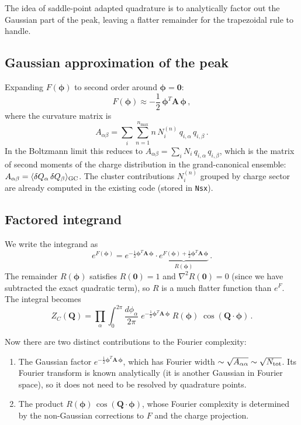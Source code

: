 \documentclass[11pt,a4paper]{article}
\newcommand{\bphi}{\bm{\phi}}
\newcommand{\bQ}{\bm{Q}}
\newcommand{\bA}{\bm{A}}
\begin{document}
The idea of saddle-point adapted quadrature is to analytically factor out the Gaussian part of the peak, leaving a flatter remainder for the trapezoidal rule to handle.

\subsection{Gaussian approximation of the peak}

Expanding $F(\bphi)$ to second order around $\bphi = \bm{0}$:
\begin{equation}\label{eq:F-expand}
  F(\bphi) \approx -\frac{1}{2}\,\bphi^T \bA\,\bphi\,,
\end{equation}
where the curvature matrix is
\begin{equation}\label{eq:A-def}
  A_{\alpha\beta} = \sum_i \sum_{n=1}^{n_{\max}} n\,N_i^{(n)}\,q_{i,\alpha}\,q_{i,\beta}\,.
\end{equation}
In the Boltzmann limit this reduces to $A_{\alpha\beta} = \sum_i N_i\,q_{i,\alpha}\,q_{i,\beta}$, which is the matrix of second moments of the charge distribution in the grand-canonical ensemble: $A_{\alpha\beta} = \langle \delta Q_\alpha\,\delta Q_\beta \rangle_{\rm GC}$.
The cluster contributions $N_i^{(n)}$ grouped by charge sector are already computed in the existing code (stored in \texttt{Nsx}).

\subsection{Factored integrand}

We write the integrand as
\begin{equation}\label{eq:factored}
  e^{F(\bphi)} = e^{-\frac{1}{2}\bphi^T \bA\,\bphi} \cdot \underbrace{e^{F(\bphi) + \frac{1}{2}\bphi^T \bA\,\bphi}}_{R(\bphi)}\,.
\end{equation}
The remainder $R(\bphi)$ satisfies $R(\bm{0}) = 1$ and $\nabla^2 R(\bm{0}) = 0$ (since we have subtracted the exact quadratic term), so $R$ is a much flatter function than $e^{F}$.
The integral becomes
\begin{equation}\label{eq:ZC-factored}
  Z_C(\bQ) = \prod_\alpha \int_0^{2\pi} \frac{d\phi_\alpha}{2\pi}\;
  e^{-\frac{1}{2}\bphi^T \bA\,\bphi}\;R(\bphi)\;\cos(\bQ \cdot \bphi)\,.
\end{equation}

Now there are two distinct contributions to the Fourier complexity:
\begin{enumerate}
  \item The Gaussian factor $e^{-\frac{1}{2}\bphi^T \bA\,\bphi}$, which has Fourier width $\sim \sqrt{A_{\alpha\alpha}} \sim \sqrt{N_{\rm tot}}$.
  Its Fourier transform is known analytically (it is another Gaussian in Fourier space), so it does not need to be resolved by quadrature points.
  \item The product $R(\bphi)\,\cos(\bQ \cdot \bphi)$, whose Fourier complexity is determined by the non-Gaussian corrections to $F$ and the charge projection.
\end{enumerate}
\end{document}
